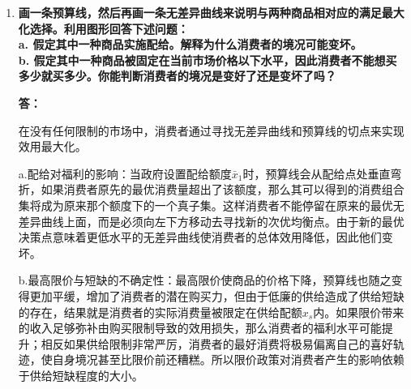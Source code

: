 \begin{enumerate}[label=\textbf{\arabic*.}, leftmargin=*]
			\textbf{答：}
			
			序数效用与基数效用的核心区别在于对“效用是否可以量化”的认知不同。
			
			基数效用论认为，效用是可以具体量化和精确度量的。就像长度有“米”、重量有“千克”一样，效用也可以用明确的绝对数值（如 10 个效用单位）来表示满足程度的高低。这种理论主要采用边际效用分析法来研究消费者行为。
			
			序数效用论则认为，效用只是一种主观心理感受，无法精准量化。在现实中，消费者只需要也能对不同商品组合的偏好程度进行相对高低的“排序”（比如第一、第二、第三），而不需要明确知道具体高出多少数值。该理论主要使用无差异曲线与预算线作为核心分析工具。
			
			在对消费者选择进行分析时，之所以不需要基数效用的假定，是因为基数效用依赖的主观数值度量在现实中缺乏统一且客观的衡量标准，理论显得不够严谨。只要明确消费者对不同商品组合的偏好次序（即能判断出“更喜欢 A 还是 B”，或者“两者无差异”），就可以画出完整的无差异曲线。结合预算约束，这已经足够推导出消费者的最优选择和需求规律。由于序数效用足以完成全部的逻辑推导，且更加贴合人们现实的决策直觉，因此经济学就不再需要引入复杂且难以证伪的基数效用假定了。
			
			\newpage
			\item \textbf{画一条预算线，然后再画一条无差异曲线来说明与两种商品相对应的满足最大化选择。利用图形回答下述问题：\\ a. 假定其中一种商品实施配给。解释为什么消费者的境况可能变坏。\\ b. 假定其中一种商品被固定在当前市场价格以下水平，因此消费者不能想买多少就买多少。你能判断消费者的境况是变好了还是变坏了吗？}
			
			\textbf{答：}
			
			在没有任何限制的市场中，消费者通过寻找无差异曲线和预算线的切点来实现效用最大化。
			
			a.配给对福利的影响：当政府设置配给额度$\bar{x}_1$时，预算线会从配给点处垂直弯折，如果消费者原先的最优消费量超出了该额度，那么其可以得到的消费组合集将成为原来那个额度下的一个真子集。这样消费者不能停留在原来的最优无差异曲线上面，而是必须向左下方移动去寻找新的次优均衡点。由于新的最优决策点意味着更低水平的无差异曲线使消费者的总体效用降低，因此他们变坏。
			
			b.最高限价与短缺的不确定性：最高限价使商品的价格下降，预算线也随之变得更加平缓，增加了消费者的潜在购买力，但由于低廉的供给造成了供给短缺的存在，结果就是消费者的实际消费量被限定在供给配额$x_s$内。如果限价带来的收入足够弥补由购买限制导致的效用损失，那么消费者的福利水平可能提升；相反如果供给限制非常严厉，消费者的最好消费将极易偏离自己的喜好轨迹，使自身境况甚至比限价前还糟糕。所以限价政策对消费者产生的影响依赖于供给短缺程度的大小。
			

\end{enumerate}
